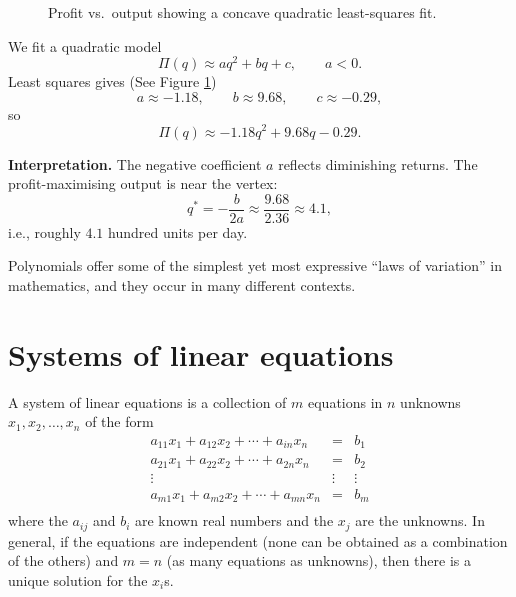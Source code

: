 \begin{example}
\begin{figure}[h]
\begin{tikzpicture}[scale=0.95]
%

\end{tikzpicture}
\caption{Profit vs.\ output showing a concave quadratic least-squares fit.}
\label{fig:quadratic-fit}
\end{figure}

We fit a quadratic model
\[
\Pi(q)\approx aq^2 + bq + c,\qquad a<0.
\]
Least squares gives (See Figure \ref{fig:quadratic-fit})
\[
a\approx -1.18,\qquad b\approx 9.68,\qquad c\approx -0.29,
\]
so
\[
\boxed{\,\Pi(q)\approx -1.18q^2 + 9.68q - 0.29.\,}
\]

\noindent
\textbf{Interpretation.}
The negative coefficient $a$ reflects diminishing returns.  
The profit-maximising output is near the vertex:
\[
q^* = -\frac{b}{2a} \approx \frac{9.68}{2.36} \approx 4.1,
\]
i.e., roughly $4.1$ hundred units per day.


\end{example}


Polynomials offer some of the simplest yet most expressive ``laws of
variation'' in mathematics, and they occur in many different contexts.

\section{Systems of linear equations}

A system of linear equations is a collection of $m$ equations in $n$ unknowns $x_1,x_2,\ldots,x_n$ of the form
\[
\begin{array}{lcl}
a_{11}x_1 + a_{12}x_2 + \cdots + a_{in}x_n &= &b_1 \\
a_{21}x_1 + a_{22}x_2 + \cdots + a_{2n}x_n &= &b_2\\
\vdots & \vdots & \vdots \\
a_{m1}x_1 + a_{m2}x_2 + \cdots + a_{mn}x_n &= &b_m\\

\end{array}
\]
where the $a_{ij}$ and $b_i$ are known real numbers and the $x_j$ are the
unknowns. In general, if the equations are independent (none can be obtained as a combination of the others) and $m = n$ (as many equations as unknowns), then there is a unique solution for the $x_i$s.

